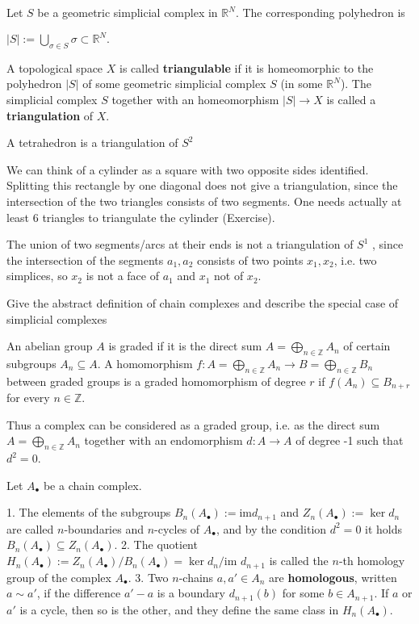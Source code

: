 Let \(S\) be a geometric simplicial complex in \(\mathbb{R}^N\). The corresponding polyhedron is 

\( |S| := \bigcup_{\sigma \in S} \sigma \subset \mathbb{R}^N.\)

A topological space \(X\) is called \textbf{triangulable} if it is homeomorphic to the polyhedron \(|S|\) of some geometric simplicial complex \(S\) (in some \(\mathbb{R}^N\)). The simplicial complex \(S\) together with an homeomorphism \(|S| \to X\) is called a \textbf{triangulation} of \(X\).

A tetrahedron is a triangulation of \( S^2 \)

We can think of a cylinder as a square with two opposite sides identified. Splitting this
rectangle by one diagonal does not give a triangulation, since the intersection of the two
triangles consists of two segments. One needs actually at least 6 triangles to triangulate
the cylinder (Exercise).

The union of two segments/arcs at their ends is not a triangulation of \( S^1 \) , since the
intersection of the segments \( a_1, a_2 \) consists of two points \( x_1, x_2 \), i.e. two simplices, so 
\( x_2 \) is not a face of \( a_1 \) and \( x_1 \) not of \( x_2 \).

Give the abstract definition of chain complexes and describe the special case of simplicial complexes 

An abelian group \(A\) is graded if it is the direct sum \(A = \bigoplus_{n \in \mathbb{Z}} A_n\) of certain subgroups \(A_n \subseteq A\). 
A homomorphism \(f: A = \bigoplus_{n \in \mathbb{Z}} A_n \to B = \bigoplus_{n \in \mathbb{Z}} B_n\) between graded groups is a graded homomorphism of degree \(r\) if \(f(A_n) \subseteq B_{n+r}\) 
for every \(n \in \mathbb{Z}\).

Thus a complex can be considered as a graded group, i.e. as the direct sum \(A = \bigoplus_{n \in \mathbb{Z}} A_n\) together with an endomorphism \(d: A \to A\) of degree -1 such that \(d^2 = 0\). 

Let \(A_\bullet\) be a chain complex. 

1. The elements of the subgroups \(B_n(A_\bullet) := \text{im} d_{n+1}\) and \(Z_n(A_\bullet) := \ker d_n\) are called \(n\)-boundaries and \(n\)-cycles of \(A_\bullet\), and by the condition \(d^2 = 0\) it holds \(B_n(A_\bullet) \subseteq Z_n(A_\bullet)\).
2. The quotient \(H_n(A_\bullet) := Z_n(A_\bullet) / B_n(A_\bullet) = \ker d_n / \text{im } d_{n+1}\) is called the \(n\)-th homology group of the complex \(A_\bullet\).
3. Two \(n\)-chains \(a, a' \in A_n\) are \textbf{homologous}, written \(a \sim a'\), if the difference \(a' - a\) is a boundary \(d_{n+1}(b)\) for some \(b \in A_{n+1}\). If \(a\) or \(a'\) is a cycle, then so is the other, and they define the same class in \(H_n(A_\bullet)\).

